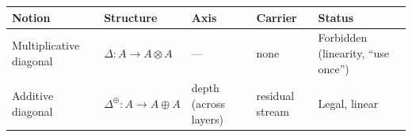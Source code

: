 \documentclass[a4paper,11pt]{article}
\begin{document}
\begin{longtable}[]{@{}lllll@{}}
\toprule
\begin{minipage}[b]{0.17\columnwidth}\raggedright
Notion\strut
\end{minipage} & \begin{minipage}[b]{0.17\columnwidth}\raggedright
Structure\strut
\end{minipage} & \begin{minipage}[b]{0.17\columnwidth}\raggedright
Axis\strut
\end{minipage} & \begin{minipage}[b]{0.17\columnwidth}\raggedright
Carrier\strut
\end{minipage} & \begin{minipage}[b]{0.17\columnwidth}\raggedright
Status\strut
\end{minipage}\tabularnewline
\midrule
\endhead
\begin{minipage}[t]{0.17\columnwidth}\raggedright
Multiplicative diagonal\strut
\end{minipage} & \begin{minipage}[t]{0.17\columnwidth}\raggedright
\(\Delta:A\to A\otimes A\)\strut
\end{minipage} & \begin{minipage}[t]{0.17\columnwidth}\raggedright
---\strut
\end{minipage} & \begin{minipage}[t]{0.17\columnwidth}\raggedright
none\strut
\end{minipage} & \begin{minipage}[t]{0.17\columnwidth}\raggedright
Forbidden (linearity, ``use once'')\strut
\end{minipage}\tabularnewline
\begin{minipage}[t]{0.17\columnwidth}\raggedright
Additive diagonal\strut
\end{minipage} & \begin{minipage}[t]{0.17\columnwidth}\raggedright
\(\Delta^{\oplus}:A\to A\oplus A\)\strut
\end{minipage} & \begin{minipage}[t]{0.17\columnwidth}\raggedright
depth (across layers)\strut
\end{minipage} & \begin{minipage}[t]{0.17\columnwidth}\raggedright
residual stream\strut
\end{minipage} & \begin{minipage}[t]{0.17\columnwidth}\raggedright
Legal, linear\strut

\end{minipage}
\end{longtable}
\end{document}
